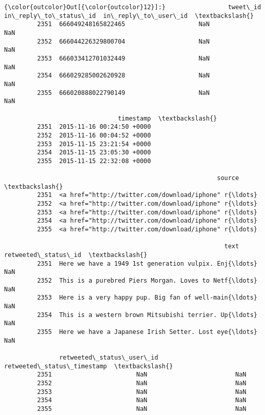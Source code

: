 \documentclass[11pt]{article}
\begin{document}
\begin{Verbatim}[commandchars=\\\{\}]
{\color{outcolor}Out[{\color{outcolor}12}]:}                 tweet\_id  in\_reply\_to\_status\_id  in\_reply\_to\_user\_id  \textbackslash{}
         2351  666049248165822465                    NaN                  NaN   
         2352  666044226329800704                    NaN                  NaN   
         2353  666033412701032449                    NaN                  NaN   
         2354  666029285002620928                    NaN                  NaN   
         2355  666020888022790149                    NaN                  NaN   
         
                               timestamp  \textbackslash{}
         2351  2015-11-16 00:24:50 +0000   
         2352  2015-11-16 00:04:52 +0000   
         2353  2015-11-15 23:21:54 +0000   
         2354  2015-11-15 23:05:30 +0000   
         2355  2015-11-15 22:32:08 +0000   
         
                                                          source  \textbackslash{}
         2351  <a href="http://twitter.com/download/iphone" r{\ldots}   
         2352  <a href="http://twitter.com/download/iphone" r{\ldots}   
         2353  <a href="http://twitter.com/download/iphone" r{\ldots}   
         2354  <a href="http://twitter.com/download/iphone" r{\ldots}   
         2355  <a href="http://twitter.com/download/iphone" r{\ldots}   
         
                                                            text  retweeted\_status\_id  \textbackslash{}
         2351  Here we have a 1949 1st generation vulpix. Enj{\ldots}                  NaN   
         2352  This is a purebred Piers Morgan. Loves to Netf{\ldots}                  NaN   
         2353  Here is a very happy pup. Big fan of well-main{\ldots}                  NaN   
         2354  This is a western brown Mitsubishi terrier. Up{\ldots}                  NaN   
         2355  Here we have a Japanese Irish Setter. Lost eye{\ldots}                  NaN   
         
               retweeted\_status\_user\_id retweeted\_status\_timestamp  \textbackslash{}
         2351                       NaN                        NaN   
         2352                       NaN                        NaN   
         2353                       NaN                        NaN   
         2354                       NaN                        NaN   
         2355                       NaN                        NaN   
         

\end{Verbatim}
\end{document}
